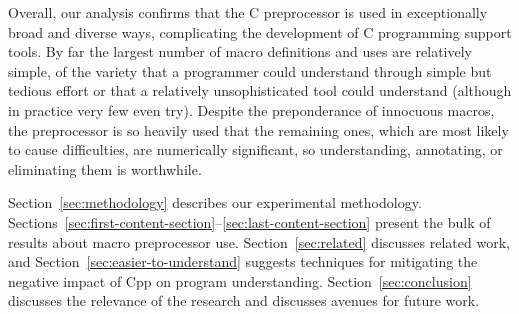 \documentclass[10pt]{article}
\def\numpackages{30}
\begin{document}
Overall, our analysis confirms that the C preprocessor is used in
exceptionally broad and diverse ways, complicating the development of C
programming support tools.  By far the largest number of macro definitions
and uses are relatively simple, of the variety that a programmer could
understand through simple but tedious effort or that a relatively
unsophisticated tool could understand (although in practice very few even
try).  Despite the preponderance of innocuous macros, the preprocessor is
so heavily used that the remaining ones, which are most likely to cause
difficulties, are numerically significant, so understanding, annotating, or
eliminating them is worthwhile.

Section~\ref{sec:methodology} describes our experimental methodology.
Sections~\ref{sec:first-content-section}--\ref{sec:last-content-section}
present the bulk of results about macro preprocessor use.
Section~\ref{sec:related} discusses related work, and
Section~\ref{sec:easier-to-understand} suggests techniques for mitigating
the negative impact of Cpp on program understanding.
Section~\ref{sec:conclusion} discusses the relevance of the research and
discusses avenues for future work.


% 
% 
% 
% 
% 
\end{document}
